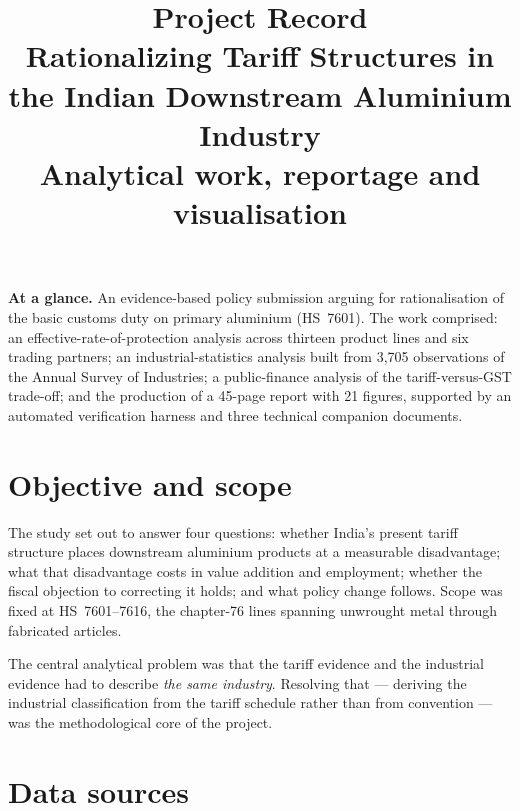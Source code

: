 \documentclass[11pt, a4paper]{article}
\title{\textbf{Project Record}\\
\large Rationalizing Tariff Structures in the Indian Downstream Aluminium Industry\\
\normalsize Analytical work, reportage and visualisation}
\author{}
\date{}
\begin{document}
\maketitle
\vspace{-0.9cm}

\begin{glance}
\textbf{At a glance.} An evidence-based policy submission arguing for rationalisation
of the basic customs duty on primary aluminium (HS~7601). The work comprised: an
effective-rate-of-protection analysis across thirteen product lines and six trading
partners; an industrial-statistics analysis built from 3,705 observations of the
Annual Survey of Industries; a public-finance analysis of the tariff-versus-GST
trade-off; and the production of a 45-page report with 21 figures, supported by an
automated verification harness and three technical companion documents.
\end{glance}

\section{Objective and scope}

The study set out to answer four questions: whether India's present tariff structure
places downstream aluminium products at a measurable disadvantage; what that
disadvantage costs in value addition and employment; whether the fiscal objection to
correcting it holds; and what policy change follows. Scope was fixed at
HS~7601--7616, the chapter-76 lines spanning unwrought metal through fabricated
articles.

The central analytical problem was that the tariff evidence and the industrial
evidence had to describe \emph{the same industry}. Resolving that --- deriving the
industrial classification from the tariff schedule rather than from convention ---
was the methodological core of the project.

\section{Data sources}
\end{document}
